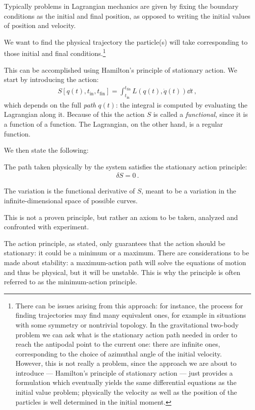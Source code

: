 \documentclass[main.tex]{subfiles}
\begin{document}
Typically problems in Lagrangian mechanics are given by fixing the boundary conditions as the initial and final position, as opposed to writing the initial values of position and velocity. 

We want to find the physical trajectory the particle(s) will take corresponding to those initial and final conditions.\footnote{There can be issues arising from this approach: for instance, the process for finding trajectories may find many equivalent ones, for example in situations with some symmetry or nontrivial topology.
In the gravitational two-body problem we can ask what is the stationary action path needed in order to reach the antipodal point to the current one: there are infinite ones, corresponding to the choice of azimuthal angle of the initial velocity.
However, this is not really a problem, since the approach we are about to introduce --- Hamilton's principle of stationary action --- just provides a formulation which eventually yields the same differential equations as the initial value problem; physically the velocity as well as the position of the particles is well determined in the initial moment.}

This can be accomplished using Hamilton's principle of stationary action. We start by introducing the action: 
%
\begin{align}
S[q(t), t _{\text{in}}, t _{\text{fin}}] = \int_{t _{\text{in}}}^{t _{\text{fin}}} L(q(t), \dot{q}(t)) \dd{t}
\,,
\end{align}
%
which depends on the full \emph{path} \(q(t)\): the integral is computed by evaluating the Lagrangian along it.
Because of this the action \(S\) is called a \emph{functional}, since it is a function of a function. The Lagrangian, on the other hand, is  a regular function.

We then state the following: 
\begin{claim}
The path taken physically by the system satisfies the stationary action principle: 
%
\begin{align}
\delta S = 0
\,.
\end{align}

The variation is the functional derivative of \(S\), meant to be a variation in the infinite-dimensional space of possible curves.
\end{claim}

This is not a proven principle, but rather an axiom to be taken, analyzed and confronted with experiment. 

The action principle, as stated, only guarantees that the action should be stationary: it could be a minimum or a maximum.
There are considerations to be made about stability: a maximum-action path will solve the equations of motion and thus be physical, but it will be unstable. This is why the principle is often referred to as the minimum-action principle. 
\end{document}
